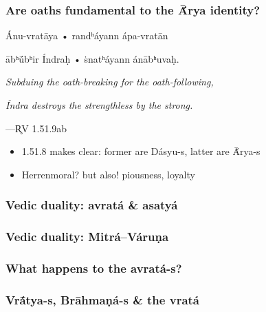\documentclass[pdf]{beamer}
\begin{document}
\begin{frame} \frametitle{Are oaths fundamental to the Ā́rya identity?}
\begin{center}
	Ánu-vratāya • randʰáyann ápa-vratān

	ābʰū́bʰir Índraḥ • ṡnatʰáyann ánābʰuvaḥ.

	\vspace{12pt}

	\textit{Subduing the oath-breaking for the oath-following,}

	\textit{Índra destroys the strengthless by the strong.}

	\vspace{12pt}

 	---R̥V 1.51.9ab
\end{center}

\begin{itemize}
	\item 1.51.8 makes clear: former are Dásyu-s, latter are Ā́rya-s
	\item Herrenmoral? but also! piousness, loyalty
\end{itemize}
\end{frame}

\begin{frame} \frametitle{Vedic duality: avratá \& asatyá}
\end{frame}

\begin{frame} \frametitle{Vedic duality: Mitrá--Váruṇa}
\end{frame}

\begin{frame} \frametitle{What happens to the avratá-s?}
\end{frame}

\begin{frame} \frametitle{Vrā́tya-s, Brāhmaṇá-s \& the vratá}
\end{frame}
\end{document}
